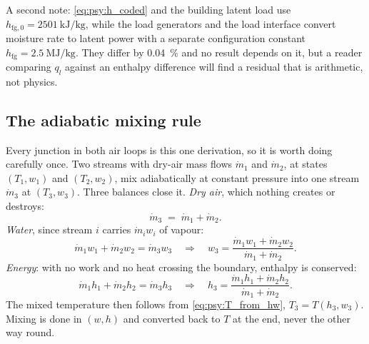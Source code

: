 \documentclass[11pt]{article}
\newcommand{\md}{\ensuremath{\dot m}}
\newcommand{\hfg}{\ensuremath{h_{\mathrm{fg}}}}
\newcommand{\ql}{\ensuremath{q_{l}}}
\begin{document}
A second note: \eqref{eq:psy:h_coded} and the building latent load use $h_{\mathrm{fg},0} =
\SI{2501}{\kilo\joule\per\kilogram}$, while the load generators and the load interface convert
moisture rate to latent power with a separate configuration constant $\hfg =
\SI{2.5}{\mega\joule\per\kilogram}$. They differ by \SI{0.04}{\percent} and no result depends on it,
but a reader comparing $\ql$ against an enthalpy difference will find a residual that is arithmetic,
not physics.

\subsection{The adiabatic mixing rule}
\label{sec:psy:mixing}

Every junction in both air loops is this one derivation, so it is worth doing carefully once. Two
streams with dry-air mass flows $\md_1$ and $\md_2$, at states $(T_1,w_1)$ and $(T_2,w_2)$, mix
adiabatically at constant pressure into one stream $\md_3$ at $(T_3,w_3)$. Three balances close it.
\emph{Dry air}, which nothing creates or destroys:
\begin{equation}
\md_3 \;=\; \md_1 + \md_2 . \label{eq:psy:mix_air}
\end{equation}
\emph{Water}, since stream $i$ carries $\md_i w_i$ of vapour:
\begin{equation}
\md_1 w_1 + \md_2 w_2 = \md_3 w_3 \quad\Longrightarrow\quad
w_3 = \frac{\md_1 w_1 + \md_2 w_2}{\md_1 + \md_2} . \label{eq:psy:mix_w}
\end{equation}
\emph{Energy}: with no work and no heat crossing the boundary, enthalpy is conserved:
\begin{equation}
\md_1 h_1 + \md_2 h_2 = \md_3 h_3 \quad\Longrightarrow\quad
h_3 = \frac{\md_1 h_1 + \md_2 h_2}{\md_1 + \md_2} . \label{eq:psy:mix_h}
\end{equation}
The mixed temperature then follows from \eqref{eq:psy:T_from_hw}, $T_3 = T(h_3,w_3)$. Mixing is done
in $(w,h)$ and converted back to $T$ at the end, never the other way round.
\end{document}

